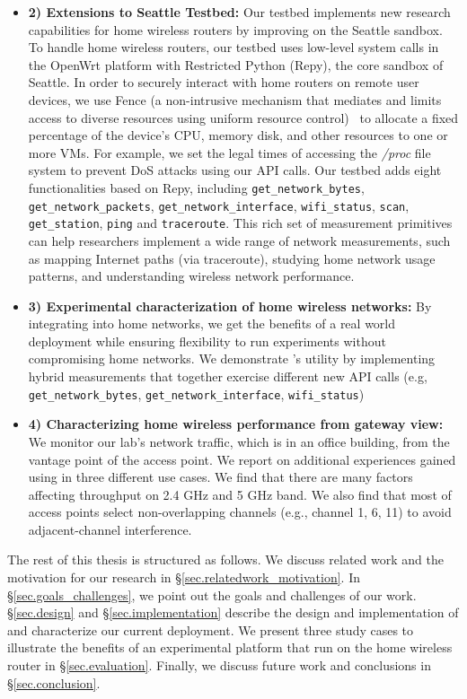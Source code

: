 {{\begin{itemize}
\item\textbf{2) Extensions to Seattle Testbed:}  Our testbed implements new
research capabilities for home wireless routers by improving on the Seattle sandbox.
To handle home wireless routers, our testbed uses low-level system calls in
the OpenWrt platform with Restricted Python (Repy)\cite{cappos2010retaining},
the core sandbox of Seattle. In order to securely interact with home routers on
remote user devices, we use Fence (a non-intrusive mechanism that mediates and
 limits access to diverse resources using uniform resource control)~\cite{li2015fence}
 to allocate a fixed percentage of the device's CPU, memory disk, and other resources
  to one or more VMs. For example, we set the legal times of accessing the \emph{/proc}
  file system to prevent DoS attacks using our API calls. Our testbed adds eight functionalities
   based on Repy, including \texttt{get\_network\_bytes}, \texttt{get\_network\_packets},
    \texttt{get\_network\_interface}, \texttt{wifi\_status}, \texttt{scan},
     \texttt{get\_station}, \texttt{ping} and \texttt{traceroute}. This rich set
      of measurement primitives can help researchers implement a wide range of
      network measurements, such as mapping Internet paths (via traceroute),
      studying home network usage patterns, and understanding wireless network performance.

\item\textbf{3) Experimental characterization of home wireless networks:} By
integrating \sysname into home networks, we get the benefits of a real world
deployment while ensuring flexibility to run experiments without compromising
home networks. We demonstrate \sysname's utility by implementing hybrid measurements
 that together exercise different new API calls (e.g, \texttt{get\_network\_bytes},
  \texttt{get\_network\_interface}, \texttt{wifi\_status})

   \item\textbf{4) Characterizing home wireless performance from gateway view:}
  We monitor our lab's network traffic, which is in an office building, from the
  vantage point of the access point. We report on additional experiences gained
   using \sysname in three different use cases. We find that there are many
   factors affecting throughput on 2.4 GHz and 5 GHz band.
   We also find that most of access points select non-overlapping channels
    (e.g., channel 1, 6, 11) to avoid adjacent-channel interference.
\end{itemize}
\par}
The rest of this thesis is structured as follows. We discuss related work and
the motivation for our research in \S{\ref{sec.relatedwork_motivation}}.
In \S{\ref{sec.goals_challenges}}, we point out the goals and challenges of our work.
 \S{\ref{sec.design}} and \S{\ref{sec.implementation}} describe the design and
 implementation of \sysname and characterize our current deployment. We present
 three study cases to illustrate the benefits of an experimental platform that
 run on the home wireless router in \S{\ref{sec.evaluation}}. Finally, we discuss
 future work and conclusions in \S{\ref{sec.conclusion}}.



}
